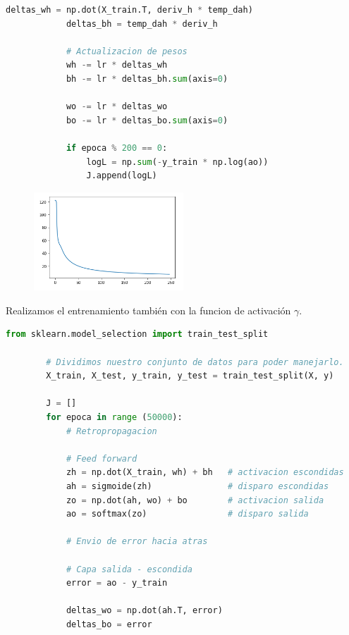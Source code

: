 \documentclass[letterpaper,11pt]{article}
\begin{document}
\begin{enumerate}
\begin{enumerate}
\begin{lstlisting}[language=Python]
            deltas_wh = np.dot(X_train.T, deriv_h * temp_dah)
            deltas_bh = temp_dah * deriv_h

            # Actualizacion de pesos
            wh -= lr * deltas_wh
            bh -= lr * deltas_bh.sum(axis=0)

            wo -= lr * deltas_wo
            bo -= lr * deltas_bo.sum(axis=0)
            
            if epoca % 200 == 0:
                logL = np.sum(-y_train * np.log(ao))
                J.append(logL)
        \end{lstlisting}

        \begin{figure}[ht]
            \centering
            \includegraphics[width=0.5\textwidth]{./imagenes/logL-tan.png}
        \end{figure}

        \newpage
        Realizamos el entrenamiento también con la funcion de activación 
        $\gamma$.
        \begin{lstlisting}[language=Python]
        from sklearn.model_selection import train_test_split

        # Dividimos nuestro conjunto de datos para poder manejarlo.
        X_train, X_test, y_train, y_test = train_test_split(X, y)

        J = []
        for epoca in range (50000):
            # Retropropagacion
            
            # Feed forward
            zh = np.dot(X_train, wh) + bh   # activacion escondidas
            ah = sigmoide(zh)               # disparo escondidas
            zo = np.dot(ah, wo) + bo        # activacion salida 
            ao = softmax(zo)                # disparo salida
            
            # Envio de error hacia atras
            
            # Capa salida - escondida  
            error = ao - y_train

            deltas_wo = np.dot(ah.T, error)
            deltas_bo = error


\end{lstlisting}
\end{enumerate}
\end{enumerate}
\end{document}
